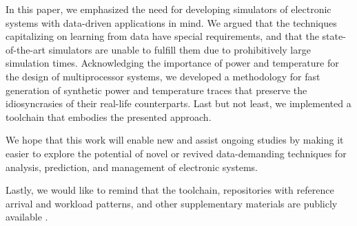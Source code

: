 In this paper, we emphasized the need for developing simulators of electronic
systems with data-driven applications in mind. We argued that the techniques
capitalizing on learning from data have special requirements, and that the
state-of-the-art simulators are unable to fulfill them due to prohibitively
large simulation times. Acknowledging the importance of power and temperature
for the design of multiprocessor systems, we developed a methodology for fast
generation of synthetic power and temperature traces that preserve the
idiosyncrasies of their real-life counterparts. Last but not least, we
implemented a toolchain that embodies the presented approach.

We hope that this work will enable new and assist ongoing studies by making it
easier to explore the potential of novel or revived data-demanding techniques
for analysis, prediction, and management of electronic systems.

Lastly, we would like to remind that the toolchain, repositories with reference
arrival and workload patterns, and other supplementary materials are publicly
available \cite{sources}.
